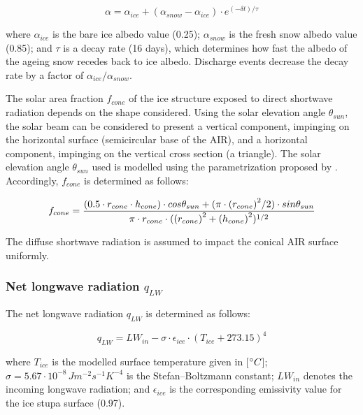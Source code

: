 \begin{equation} \alpha=\alpha_{ice}+(\alpha_{snow}-\alpha_{ice}) \cdot e^{(-\delta t)/\tau} \label{eqn:alb}
\end{equation}

where $\alpha_{ice}$ is the bare ice albedo value (0.25); $\alpha_{snow}$ is the fresh snow albedo value (0.85);
and $\tau$ is a decay rate (16 days), which determines how fast the albedo of the ageing snow recedes back to
ice albedo. Discharge events decrease the decay rate by a factor of $\alpha_{ice}/\alpha_{snow}$.

The solar area fraction $f_{cone}$ of the ice structure exposed to direct shortwave radiation depends on the shape
considered. Using the solar elevation angle $\theta_{sun}$, the solar beam can be considered to present a vertical
component, impinging on the horizontal surface (semicircular base of the \ac{AIR}), and a horizontal component,
impinging on the vertical cross section (a triangle). The solar elevation angle $\theta_{sun}$ used is modelled
using the parametrization proposed by \cite{woolfComputationSolarElevation1968}. Accordingly, $f_{cone}$ is determined as follows:

\begin{equation}
	\begin{split}
		f_{cone}& =\frac{(0.5 \cdot r_{cone} \cdot h_{cone}) \cdot cos \theta_{sun} +(\pi \cdot
		{(r_{cone})}^2/2) \cdot sin \theta_{sun} }{\pi \cdot r_{cone} \cdot ({(r_{cone})}^2+{(h_{cone})}^2)^{1/2}}\\
	\end{split}
	\label{eqn:f_{cone} }
\end{equation}

The diffuse shortwave radiation is assumed to impact the conical \ac{AIR} surface uniformly.

\subsubsection{Net longwave radiation \texorpdfstring{$q_{LW}$}{Lg}} \label{sec:LW}

The net longwave radiation $q_{LW}$ is determined as follows:

\begin{equation}
	q_{LW}= LW_{in}-\sigma \cdot \epsilon_{ice} \cdot {(T_{ice}+ 273.15)}^4
	\label{eqn:LW}
\end{equation}

where $T_{ice}$ is the modelled surface temperature given in [$^{\circ} C$];
$\sigma=5.67\cdot10^{-8}\,Jm^{-2}s^{-1}K^{-4}$ is the Stefan–Boltzmann constant; $LW_{in}$ denotes the incoming
longwave radiation; and $\epsilon_{ice}$ is the corresponding emissivity value for the ice stupa surface (0.97).

